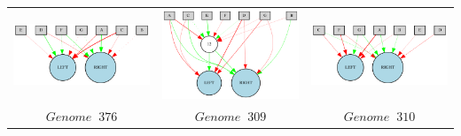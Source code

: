 \begin{table}[h]
\centering
\begin{tabular}{ccc}
\includegraphics[scale=0.4]{include/images/sim_network_1.PNG} & \includegraphics[scale=0.4]{include/images/sim_network_2.PNG} & \includegraphics[scale=0.4]{include/images/sim_network_3.PNG} \\
$Genome \;  \; 376$  & $Genome \;  \; 309$  & $Genome \;  \; 310$  \\

\end{tabular}
\end{table}
